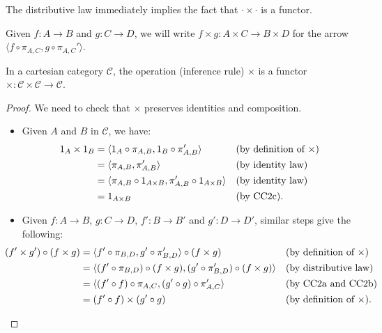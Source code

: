 The distributive law immediately implies the fact that $\cdot \times \cdot$ is a functor.

\begin{notation}\label{idx:product-arrows}
    Given $f : A \to B$ and $g : C \to D$, we will write $f \times g : A \times C \to B \times D$ for the arrow $\langle f \circ \pi_{A,C}, g \circ \pi_{A,C}'\rangle$.
\end{notation}

\begin{corollary}
    In a cartesian category $\mathcal C$, the operation (inference rule) $\times$ is a functor $\times : \mathcal C \times \mathcal C \to \mathcal C$.
\end{corollary}

\begin{proof}
    We need to check that $\times$ preserves identities and composition.
    \begin{itemize}
        \item[$\boxed{\textnormal{identity}}$] Given $A$ and $B$ in $\mathcal C$, we have:
        \begin{align*}
            1_A \times 1_B &= \langle 1_A \circ \pi_{A,B}, 1_B \circ \pi_{A,B}'\rangle &&(\textnormal{by definition of $\times$}) \\
                           &= \langle \pi_{A,B}, \pi_{A,B}'\rangle &&(\textnormal{by identity law}) \\
                           &= \langle \pi_{A,B} \circ 1_{A \times B}, \pi_{A,B}' \circ 1_{A \times B}\rangle &&(\textnormal{by identity law}) \\
                           &= 1_{A \times B} &&(\textnormal{by CC2c}).
        \end{align*}
        \item[$\boxed{\textnormal{composition}}$] Given $f : A \to B$, $g : C \to D$, $f' : B \to B'$ and $g' : D \to D'$, similar steps give the following:
        \[
        \makebox[\linewidth][c]{$\begin{aligned}
            (f' \times g') \circ (f \times g) &= \langle f' \circ \pi_{B,D}, g' \circ \pi_{B,D}'\rangle \circ (f \times g) &&(\textnormal{by definition of $\times$}) \\
                                              &= \langle (f' \circ \pi_{B,D}) \circ (f \times g), (g' \circ \pi_{B,D}') \circ (f \times g)\rangle &&(\textnormal{by distributive law})\\
                                              &= \langle (f' \circ f) \circ \pi_{A,C}, (g' \circ g) \circ \pi_{A,C}'\rangle &&(\textnormal{by CC2a and CC2b}) \\
                                              &= (f' \circ f) \times (g' \circ g) &&(\textnormal{by definition of $\times$}).
        \end{aligned}$}
        \]
    \end{itemize}
\end{proof}

